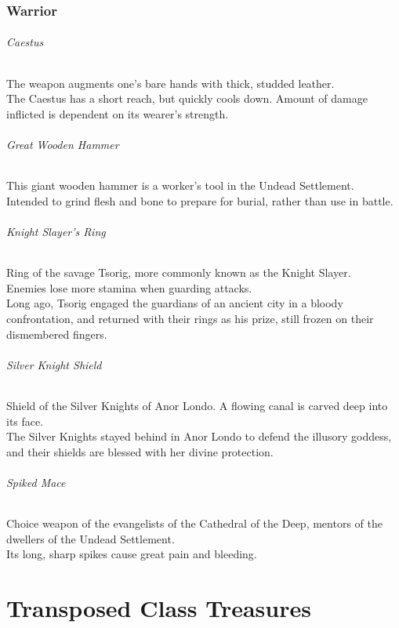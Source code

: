 \documentclass[twocolumn,a4paper]{article}
\begin{document}
\section*{Warrior}
\paragraph{Caestus}
The weapon augments one's bare hands with thick, studded leather.\\
The Caestus has a short reach, but quickly cools down. Amount of damage inflicted is dependent on its wearer's strength.
\paragraph{Great Wooden Hammer}
This giant wooden hammer is a worker's tool in the Undead Settlement.\\
Intended to grind flesh and bone to prepare for burial, rather than use in battle.
\paragraph{Knight Slayer's Ring}
Ring of the savage Tsorig, more commonly known as the Knight Slayer.\\
Enemies lose more stamina when guarding attacks.\\
Long ago, Tsorig engaged the guardians of an ancient city in a bloody confrontation, and returned with their rings as his prize, still frozen on their dismembered fingers.
\newpage %
\paragraph{Silver Knight Shield}
Shield of the Silver Knights of Anor Londo. A flowing canal is carved deep into its face.\\
The Silver Knights stayed behind in Anor Londo to defend the illusory goddess, and their shields are blessed with her divine protection.
\paragraph{Spiked Mace}
Choice weapon of the evangelists of the Cathedral of the Deep, mentors of the dwellers of the Undead Settlement.\\
Its long, sharp spikes cause great pain and bleeding.

\newpage
\part{Transposed Class Treasures}
\end{document}
